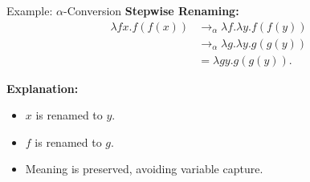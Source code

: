 \documentclass{beamer}
\begin{document}
\begin{frame}{Example: $\alpha$-Conversion}
  \textbf{Stepwise Renaming:}
  \begin{align*}
      \lambda fx. f(f(x)) &\rightarrow_{\alpha} \lambda f. \lambda y. f(f(y)) \\
      &\rightarrow_{\alpha} \lambda g. \lambda y. g(g(y)) \\
      &= \lambda gy. g(g(y)).
  \end{align*}
  
  \textbf{Explanation:}
  \begin{itemize}
      \item $x$ is renamed to $y$.
      \item $f$ is renamed to $g$.
      \item Meaning is preserved, avoiding variable capture.
  \end{itemize}
\end{frame}

  
  
  

\end{document}
